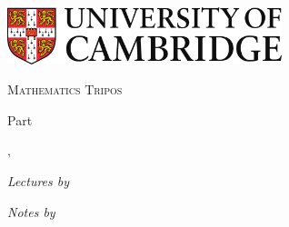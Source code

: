 \begin{titlepage}
  \begin{center}
    \includegraphics[width=0.6\textwidth]{logo.jpg}\par
    \vspace{1cm}
    {\scshape\huge Mathematics Tripos \par}
    \vspace{2cm}
    {\huge Part \npart \par}
    \vspace{0.6cm}
    {\Huge \bfseries \ntitle \par}
    \vspace{1.2cm}
    {\Large\nterm, \nyear \par}
    \vspace{2cm}
    
    {\large \emph{Lectures by } \par}
    \vspace{0.2cm}
    {\Large \scshape \nlecturer}
    
    \vspace{0.5cm}
    {\large \emph{Notes by }\par}
    \vspace{0.2cm}
    {\Large \scshape \href{mailto:\nauthoremail}{\nauthor}}
 \end{center}
\end{titlepage}